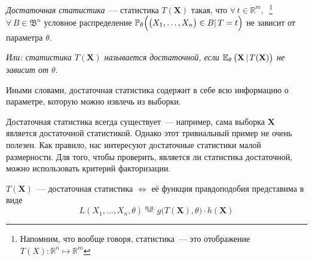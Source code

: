 
\vspace{5mm}
\begin{defn}
    \textit{Достаточная статистика}~--- статистика $T(\mathbf{X})$ такая, что $\forall \, t \in \mathbb{R}^m,$~\footnote{Напомним, что вообще говоря, статистика~--- 
    это отображение $T(X)\colon \mathbb{R}^n \mapsto \mathbb{R}^m$ } $ \forall \, B \in \mathfrak{B}^n$ условное распределение $\mathbb{P}_{\theta} \Bigl(\bigl( X_1, \ldots, X_n \bigr) \in B | \, T=t\Bigr)$ не зависит от параметра $\theta$.

    \textit{Или: статистика $T(\mathbf{X})$ называется достаточной, если $\mathbb{E}_{\theta}\, \bigl( \mathbf{X} \, | \, T(\mathbf{X}) \bigr)$ не зависит от $\theta$.}
\end{defn}

Иными словами, достаточная статистика содержит в себе всю информацию о параметре, которую можно извлечь из выборки.

Достаточная статистика всегда существует~--- например, сама выборка $\mathbf{X}$ является достаточной статистикой.
Однако этот тривиальный пример не очень полезен.
Как правило, нас интересуют достаточные статистики малой размерности.
Для того, чтобы проверить, является ли статистика достаточной, можно использовать критерий факторизации.
\begin{namedthm}
    $T(\mathbf{X})$~--- достаточная статистика $\Leftrightarrow$ её функция правдоподобия представима в виде 
    \begin{equation*}
        L(X_{1}, \ldots, X_{n} , \theta) \stackrel{\text{п.н.}}{=} g\bigl(T(\mathbf{X}), \theta\bigr) \cdot h(\mathbf{X})
    \end{equation*}
\end{namedthm}

